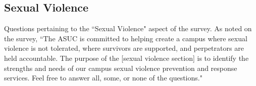 \documentclass{article}\usepackage[]{graphicx}\usepackage[]{color}
\begin{document}
\subsection{Sexual Violence}
Questions pertaining to the ``Sexual Violence" aspect of the survey. As noted on the survey, ``The ASUC is committed to helping create a campus where sexual violence is not
tolerated, where survivors are supported, and perpetrators are held accountable.
The purpose of the [sexual violence section] is to identify the strengths and needs of our campus sexual violence prevention and response services. Feel free to answer all, some,
or none of the questions."
\begin{table}[H]
\centering
{}
\end{table}
\end{document}
